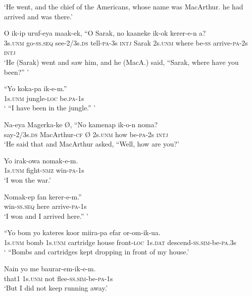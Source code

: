 \glt ‘He went, and the chief of the Americans, whose name was MacArthur. he had arrived and was there.’ \\
\z


\ea
\gll  O  ik-ip  uruf-eya  maak-ek,  ``O  Sarak,  no    kaaneke  ik-ok  kerer-e-n  a? \\
3s.\textsc{unm}  go-\textsc{ss.seq}  see-2/3s.\textsc{ds}  tell-\textsc{pa}-3s  \textsc{intj}  Sarak  2s.\textsc{unm}     where  be-\textsc{ss}  arrive-\textsc{pa}-2s  \textsc{intj} \\


\glt ‘He (Sarak) went and saw him, and he (MacA.) said, “Sarak, where have you been?” ’ \\
\z


\ea
\gll  “Yo  koka-pa  ik-e-m.” \\
1s.\textsc{unm}  jungle-\textsc{loc}  be.\textsc{pa}-1s \\
\glt ‘ “I have been in the jungle.” ’ \\
\z


\ea
\gll  Na-eya  Magerka-ke  Ø,  ``No  kamenap  ik-o-n  noma? \\
say-2/3s.\textsc{ds}  MacArthur-\textsc{cf}  Ø  2s.\textsc{unm}  how  be-\textsc{pa}-2s  \textsc{intj} \\
\glt ‘He said that and MacArthur asked, “Well, how are you?’ \\
\z


\ea
\gll  Yo  irak-owa  nomak-e-m. \\
1s.\textsc{unm}  fight-\textsc{nmz}  win-\textsc{pa}-1s \\
\glt ‘I won the war.’ \\
\z


\ea
\gll  Nomak-ep  fan  kerer-e-m.” \\
win-\textsc{ss.seq}  here  arrive-\textsc{pa}-1s \\
\glt ‘I won and I arrived here.” ’ \\
\z


\ea
\gll  “Yo  bom  yo  kateres  koor  miira-pa  efar           or-om-ik-ua. \\
1s.\textsc{unm}  bomb  1s.\textsc{unm}  cartridge  house  front-\textsc{loc}  1s.\textsc{dat}   descend-\textsc{ss}.\textsc{sim}-be-\textsc{pa}.3s \\


\glt ‘ “Bombs and cartridges kept dropping in front of my house.’ \\
\z


\ea
\gll  Nain  yo  me  baurar-em-ik-e-m. \\
that1  1s.\textsc{unm}  not  flee-\textsc{ss}.\textsc{sim}-be-\textsc{pa}-1s \\
\glt ‘But I did not keep running away.’ \\
\z


